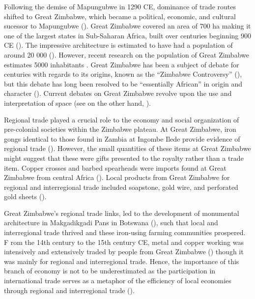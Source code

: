 Following the demise of Mapungubwe in 1290 CE, dominance of trade routes shifted to Great Zimbabwe, which became a political, economic, and cultural sucessor to Mapungubwe (\cites[][]{pikirayi1993}[][]{pwiti2005}[][]{manyanga2006}). Great Zimbabwe covered an area of 700 ha making it one of the largest states in Sub-Saharan Africa, built over centuries beginning 900 CE (\cites[][]{sinclair1993}[][]{ndoro1997}[][]{ndoro2001}). The impressive architecture is estimated to have had a population of around 20 000 (\cites[][]{garlake1973}[][]{hall1990}[][]{kim2008}). However, recent research on the population of Great Zimbabwe estimates 5000 inhabitants \parencite{chirikure2017}.
Great Zimbabwe has been a subject of debate for centuries with regards to its origins, known as the “Zimbabwe Controversy” (\cite[][]{tangri1990}), but this debate has long been resolved to be “essentially African” in origin and character (\cites[][]{randall1906}[][]{ndoro1997}). Current debates on Great Zimbabwe revolve upon the use and interpretation of space
(see \cites[][]{huffman1984a}[][]{huffman1984b}[][]{huffman1996}[][]{huffman2010}[][]{huffman2014}
on the other hand, \cites[][]{beach1998}[][]{chirikure2008}[][]{pikirayi2011}[][]{chirikure2013socio}).

Regional trade played a crucial role to the economy and social organization of pre-colonial societies within the Zimbabwe plateau. At Great Zimbabwe, iron gongs identical to those found in Zambia at Ingombe Ilede provide evidence of regional trade (\cite[][]{garlake1973}). However, the small quantities of these items at Great Zimbabwe might suggest that these were gifts presented to the royalty rather than a trade item. Copper crosses and barbed spearheads were imports found at Great Zimbabwe from central Africa (\cites[][]{pikirayi2006}[][]{pikirayi2017}). Local products from Great Zimbabwe for regional and interregional trade included soapstone, gold wire, and perforated gold sheets (\cites[][]{garlake1973}[][]{pikirayi2006}[][]{pikirayi2017}).

Great Zimbabwe’s regional trade links, led to the development of monumental architecture in Makgadikgadi Pans in Botswana (\cite[][]{pikirayi2017}), such that local and interregional trade thrived and these iron-using farming communities prospered. F	rom the 14th century to the 15th century CE, metal and copper working was intensively and extensively traded by people from Great Zimbabwe (\cite[][]{garlake1973}) though it was mainly for regional and interregional trade. Hence, the importance of this branch of economy is not to be underestimated as the participation in international trade serves as a metaphor of  the efficiency of local economies through regional and interregional trade (\cites[][]{pwiti1991}[][]{pwiti2005}[][]{manyanga2006}[][]{pikirayi2006}).

